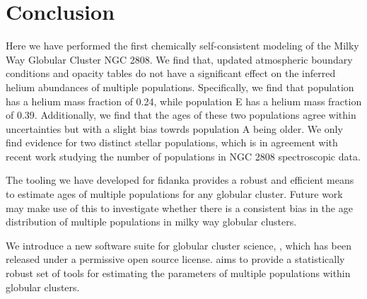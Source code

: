 \section{Conclusion}\label{sec:2808conclusion}
Here we have performed the first chemically self-consistent modeling of the
Milky Way Globular Cluster NGC 2808. We find that, updated atmospheric boundary
conditions and opacity tables do not have a significant effect on the inferred
helium abundances of multiple populations. Specifically, we find that
population  has a helium mass fraction of 0.24, while population E has a helium
mass fraction of 0.39. Additionally, we find that the ages of these two
populations agree within uncertainties but with a slight bias towrds population
A being older. We only find evidence for two distinct stellar populations,
which is in agreement with recent work studying the number of populations in
NGC 2808 spectroscopic data.

The tooling we have developed for fidanka provides a robust and efficient means
to estimate ages of multiple populations for any globular cluster. Future work
may make use of this to investigate whether there is a consistent bias in the age
distribution of multiple populations in milky way globular clusters.

We introduce a new software suite for globular cluster science,
\fidanka, which has been released under a permissive open source license.
\fidanka aims to provide a statistically robust set of tools for estimating the
parameters of multiple populations within globular clusters.
